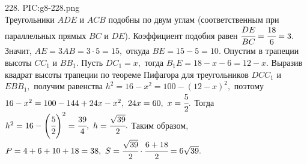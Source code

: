 228. {{PIC:g8-228.png}}\\
Треугольники $ADE$ и $ACB$ подобны по двум углам (соответственным при параллельных прямых $BC$ и $DE$). Коэффициент подобия равен $\cfrac{DE}{BC}=\cfrac{18}{6}=3.$ Значит, $AE=3AB=3\cdot5=15,$ откуда $BE=15-5=10.$ Опустим в трапеции высоты $CC_1$ и $BB_1.$ Пусть $DC_1=x,$ тогда $B_1E=18-x-6=12-x.$ Выразив квадрат высоты трапеции по теореме Пифагора для треугольников $DCC_1$ и $EBB_1,$ получим равенства $h^2=16-x^2=100-(12-x)^2,$ поэтому $16-x^2=100-144+24x-x^2,\ 24x=60,\ x=\cfrac{5}{2}.$ Тогда $h^2=16-\left(\cfrac{5}{2}\right)^2=\cfrac{39}{4},\ h=\cfrac{\sqrt{39}}{2}.$ Таким образом, $P=4+6+10+18=38,\ S=\cfrac{\sqrt{39}}{2}\cdot\cfrac{6+18}{2}=6\sqrt{39}.$\\
